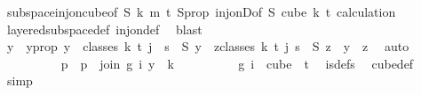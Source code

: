 \begin{isabellebody}
\ subspace{\isacharunderscore}{\kern0pt}inj{\isacharunderscore}{\kern0pt}on{\isacharunderscore}{\kern0pt}cube{\isacharbrackleft}{\kern0pt}of\ S\ k\ m\ {\isachardoublequoteopen}t{\isacharplus}{\kern0pt}{}{\isachardoublequoteclose}{\isacharbrackright}{\kern0pt}\ S{\isacharunderscore}{\kern0pt}prop\ inj{\isacharunderscore}{\kern0pt}onD{\isacharbrackleft}{\kern0pt}of\ S\ {\isachardoublequoteopen}cube\ k\ {\isacharparenleft}{\kern0pt}t{\isacharplus}{\kern0pt}{}{\isacharparenright}{\kern0pt}{\isachardoublequoteclose}{\isacharbrackright}{\kern0pt}\ calculation\ \isamarkupfalse%
\ layered{\isacharunderscore}{\kern0pt}subspace{\isacharunderscore}{\kern0pt}def\ inj{\isacharunderscore}{\kern0pt}on{\isacharunderscore}{\kern0pt}def\ \isamarkupfalse%
\ blast\isanewline
\ \ \ \ \ \ \ \ \isamarkupfalse%
\ \isamarkupfalse%
\ y\ \ y{\isacharunderscore}{\kern0pt}prop{\isacharcolon}{\kern0pt}\ {\isachardoublequoteopen}y\ {\isasymin}\ classes\ k\ t\ j\ {\isasymand}\ s\ {\isacharequal}{\kern0pt}\ S\ y\ {\isasymand}\ {\isacharparenleft}{\kern0pt}{\isasymforall}z{\isasymin}classes\ k\ t\ j{\isachardot}{\kern0pt}\ s\ {\isacharequal}{\kern0pt}\ S\ z\ {\isasymlongrightarrow}\ y\ {\isacharequal}{\kern0pt}\ z{\isacharparenright}{\kern0pt}{\isachardoublequoteclose}\ \isamarkupfalse%
\ auto\isanewline
\isanewline
\ \ \ \ \ \ \ \ \isamarkupfalse%
\ p\ \ {\isachardoublequoteopen}p\ {\isasymequiv}\ join\ {\isacharparenleft}{\kern0pt}{\isasymlambda}g{\isasymin}{\isacharbraceleft}{\kern0pt}{\isachardot}{\kern0pt}{\isachardot}{\kern0pt}{\isacharless}{\kern0pt}{}{\isacharbraceright}{\kern0pt}{\isachardot}{\kern0pt}\ i{\isacharparenright}{\kern0pt}\ y\ {}\ k{\isachardoublequoteclose}\isanewline
\ \ \ \ \ \ \ \ \isamarkupfalse%
\ {\isachardoublequoteopen}{\isacharparenleft}{\kern0pt}{\isasymlambda}g{\isasymin}{\isacharbraceleft}{\kern0pt}{\isachardot}{\kern0pt}{\isachardot}{\kern0pt}{\isacharless}{\kern0pt}{}{\isacharbraceright}{\kern0pt}{\isachardot}{\kern0pt}\ i{\isacharparenright}{\kern0pt}\ {\isasymin}\ cube\ {}\ {\isacharparenleft}{\kern0pt}t{\isacharplus}{\kern0pt}{}{\isacharparenright}{\kern0pt}{\isachardoublequoteclose}\ \isamarkupfalse%
\ is{\isacharunderscore}{\kern0pt}defs\ \isamarkupfalse%
\ cube{\isacharunderscore}{\kern0pt}def\ \isamarkupfalse%
\ simp\isanewline
\ \ \ \ \ \ \ \ \isamarkupfalse%

\end{isabellebody}
